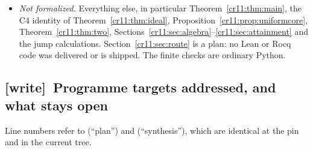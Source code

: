 \documentclass[11pt,letterpaper]{article}
\theoremstyle{plain}
\theoremstyle{definition}
\theoremstyle{remark}
\numberwithin{equation}{section}
\newcommand{\wtag}{\textup{[write]}}
\begin{document}
\begin{itemize}
no jump operator. Proposition~\ref{cr11:prop:least} is the core-member
clause of the synthesis's least-representative theorem; the library proves
that theorem's block-code clause, 
(, line 67), not this clause.
\item \emph{Not formalized.} Everything else, in particular
Theorem~\ref{cr11:thm:main}, the C4 identity of
Theorem~\ref{cr11:thm:ideal}, Proposition~\ref{cr11:prop:uniformcore},
Theorem~\ref{cr11:thm:two}, Sections~\ref{cr11:sec:algebra}--\ref{cr11:sec:attainment}
and the jump calculations. Section~\ref{cr11:sec:route} is a plan: no Lean
or Rocq code was delivered or is shipped. The finite checks are ordinary
Python.
\end{itemize}

\subsection{\wtag\ Programme targets addressed, and what stays open}\label{cr11:sec:wtargets}

Line numbers refer to
(``plan'') and 
(``synthesis''), which are identical at the pin and in the current tree.
\end{document}
